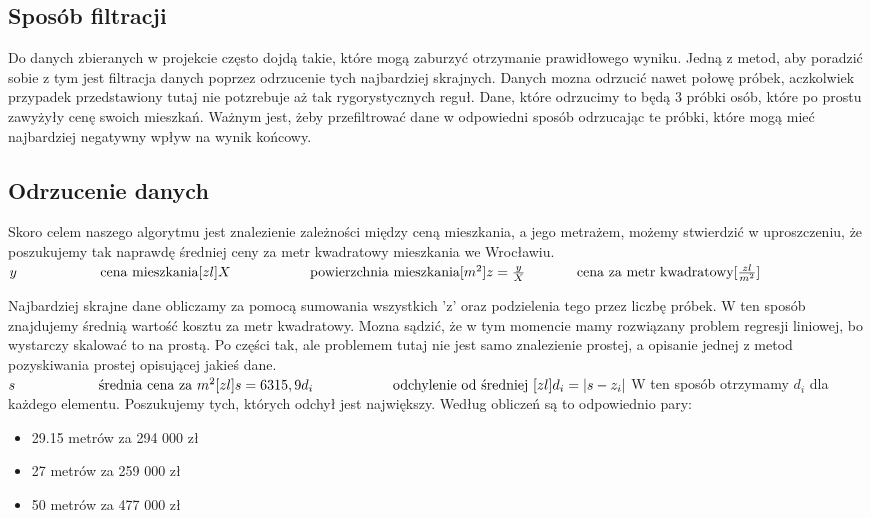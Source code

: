 	\subsection{Sposób filtracji}
Do danych zbieranych w projekcie często dojdą takie, które mogą zaburzyć otrzymanie prawidłowego wyniku. Jedną z metod, aby poradzić sobie z tym jest filtracja danych poprzez odrzucenie tych najbardziej skrajnych. Danych mozna odrzucić nawet połowę próbek, aczkolwiek przypadek przedstawiony tutaj nie potzrebuje aż tak rygorystycznych reguł. Dane, które odrzucimy to będą 3 próbki osób, które po prostu zawyżyły cenę swoich mieszkań. Ważnym jest, żeby przefiltrować dane w odpowiedni sposób odrzucając te próbki, które mogą mieć najbardziej negatywny wpływ na wynik końcowy.
	\subsection{Odrzucenie danych}
Skoro celem naszego algorytmu jest znalezienie zależności między ceną mieszkania, a jego metrażem, możemy stwierdzić w uproszczeniu, że poszukujemy tak naprawdę średniej ceny za metr kwadratowy mieszkania we Wrocławiu.
\newline
\newline
\noindent
\(
	y  \hspace{2.1cm} \textrm{cena mieszkania} [zl] \\
	X  \hspace{2cm} \textrm{powierzchnia mieszkania} [m^{2}] \\
	z = \frac{y}{X}  \hspace{1.3cm} \textrm{cena za metr kwadratowy} [\frac{zl}{m^{2}}] \\
\)


Najbardziej skrajne dane obliczamy za pomocą sumowania wszystkich 'z' oraz podzielenia tego przez liczbę próbek. W ten sposób znajdujemy średnią wartość kosztu za metr kwadratowy. Mozna sądzić, że w tym momencie mamy rozwiązany problem regresji liniowej, bo wystarczy skalować to na prostą. Po części tak, ale problemem tutaj nie jest samo znalezienie prostej, a opisanie jednej z metod pozyskiwania prostej opisującej jakieś dane.
\newline
\newline
\noindent
\(
	s  \hspace{2.1cm} \textrm{średnia cena za } m^{2} [zl] \\
	s = 6315,9 \\
	d_{i}  \hspace{2cm} \textrm{odchylenie od średniej } [zl] \\
	d_{i} = |s - z_{i}| \\
\)
W ten sposób otrzymamy \(d_{i}\) dla każdego elementu. Poszukujemy tych, których odchył jest największy. Według obliczeń są to odpowiednio pary:
\begin{itemize}

  \item 29.15 metrów za 294 000 zł
  \item 27 metrów za 259 000 zł
  \item 50 metrów za 477 000 zł

\end{itemize}

